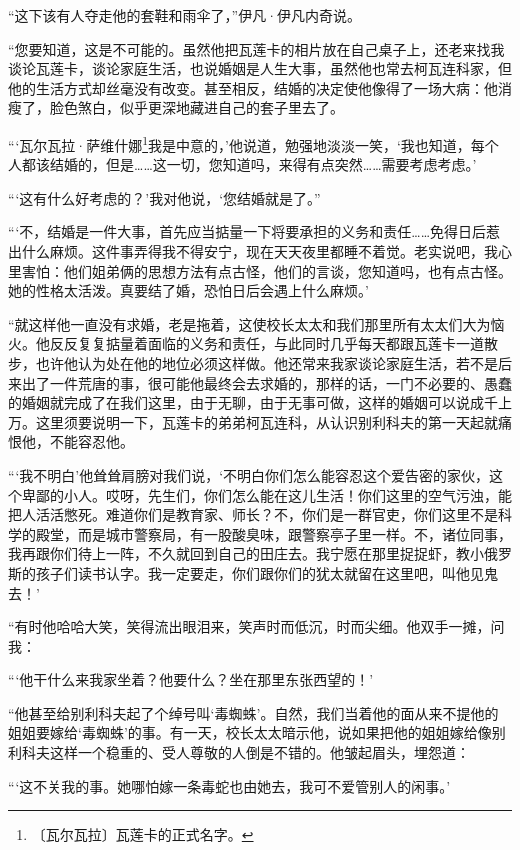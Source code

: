 \documentclass[12pt,UTF-8,openany]{ctexbook}
\begin{document}
\begin{large}
    “这下该有人夺走他的套鞋和雨伞了，”伊凡·伊凡内奇说。
    
    “您要知道，这是不可能的。虽然他把瓦莲卡的相片放在自己桌子上，还老来找我谈论瓦莲卡，谈论家庭生活，也说婚姻是人生大事，虽然他也常去柯瓦连科家，但他的生活方式却丝毫没有改变。甚至相反，结婚的决定使他像得了一场大病：他消瘦了，脸色煞白，似乎更深地藏进自己的套子里去了。
    
    “‘瓦尔瓦拉·萨维什娜\footnote{〔瓦尔瓦拉〕瓦莲卡的正式名字。}我是中意的，’他说道，勉强地淡淡一笑，‘我也知道，每个人都该结婚的，但是……这一切，您知道吗，来得有点突然……需要考虑考虑。’
    
    “‘这有什么好考虑的？’我对他说，‘您结婚就是了。”
    
    “‘不，结婚是一件大事，首先应当掂量一下将要承担的义务和责任……免得日后惹出什么麻烦。这件事弄得我不得安宁，现在天天夜里都睡不着觉。老实说吧，我心里害怕：他们姐弟俩的思想方法有点古怪，他们的言谈，您知道吗，也有点古怪。她的性格太活泼。真要结了婚，恐怕日后会遇上什么麻烦。’
    
    “就这样他一直没有求婚，老是拖着，这使校长太太和我们那里所有太太们大为恼火。他反反复复掂量着面临的义务和责任，与此同时几乎每天都跟瓦莲卡一道散步，也许他认为处在他的地位必须这样做。他还常来我家谈论家庭生活，若不是后来出了一件荒唐的事，很可能他最终会去求婚的，那样的话，一门不必要的、愚蠢的婚姻就完成了在我们这里，由于无聊，由于无事可做，这样的婚姻可以说成千上万。这里须要说明一下，瓦莲卡的弟弟柯瓦连科，从认识别利科夫的第一天起就痛恨他，不能容忍他。
    
    “‘我不明白’他耸耸肩膀对我们说，‘不明白你们怎么能容忍这个爱告密的家伙，这个卑鄙的小人。哎呀，先生们，你们怎么能在这儿生活！你们这里的空气污浊，能把人活活憋死。难道你们是教育家、师长？不，你们是一群官吏，你们这里不是科学的殿堂，而是城市警察局，有一股酸臭味，跟警察亭子里一样。不，诸位同事，我再跟你们待上一阵，不久就回到自己的田庄去。我宁愿在那里捉捉虾，教小俄罗斯的孩子们读书认字。我一定要走，你们跟你们的犹太就留在这里吧，叫他见鬼去！’
    
    “有时他哈哈大笑，笑得流出眼泪来，笑声时而低沉，时而尖细。他双手一摊，问我：
    
    “‘他干什么来我家坐着？他要什么？坐在那里东张西望的！’
    
    “他甚至给别利科夫起了个绰号叫‘毒蜘蛛’。自然，我们当着他的面从来不提他的姐姐要嫁给‘毒蜘蛛’的事。有一天，校长太太暗示他，说如果把他的姐姐嫁给像别利科夫这样一个稳重的、受人尊敬的人倒是不错的。他皱起眉头，埋怨道：
    
    “‘这不关我的事。她哪怕嫁一条毒蛇也由她去，我可不爱管别人的闲事。’
    

\end{large}
\end{document}
